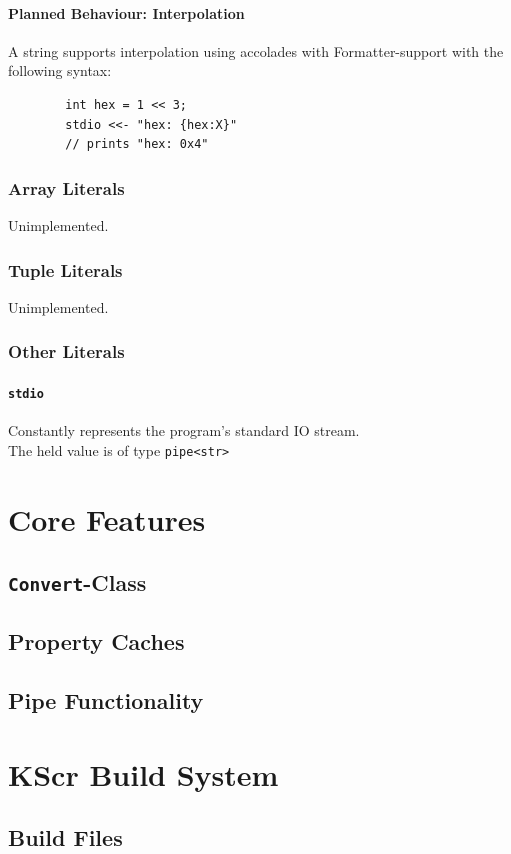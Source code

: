 \documentclass{docs}
\begin{document}
    \paragraph{Planned Behaviour: Interpolation}
    A string supports interpolation using accolades with Formatter-support with the following syntax:
    \begin{verbatim}
        int hex = 1 << 3;
        stdio <<- "hex: {hex:X}"
        // prints "hex: 0x4"
    \end{verbatim}
    
    \subsubsection{Array Literals}
    Unimplemented.
    
    \subsubsection{Tuple Literals}
    Unimplemented.
    
    \subsubsection{Other Literals}
    
    \paragraph{\texttt{stdio}}
    Constantly represents the program's standard IO stream. \\
    The held value is of type \texttt{pipe<str>}

    \pagebreak
    \section{Core Features}

    \subsection{\texttt{Convert}-Class}

    \subsection{Property Caches}

    \subsection{Pipe Functionality}

    \pagebreak
    \section{KScr Build System}

    \subsection{Build Files}
\end{document}
